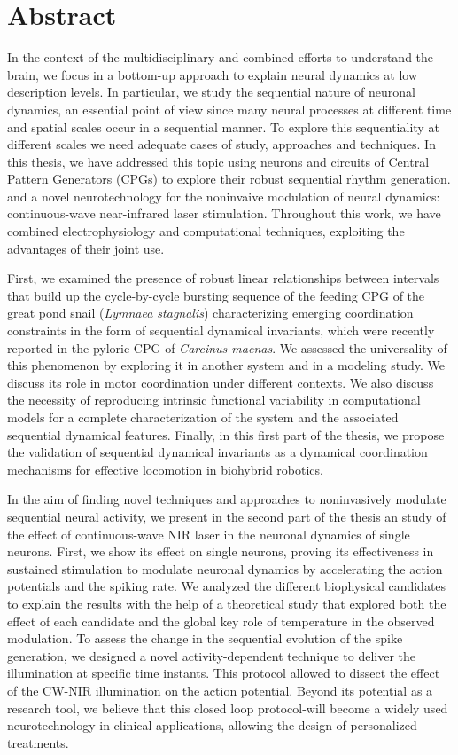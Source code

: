 \chapter*{Abstract}
In the context of the multidisciplinary and combined efforts to understand the brain, we focus in a bottom-up approach to explain neural dynamics at low description 
 levels. In particular, we study the sequential nature of neuronal dynamics, an essential point of view since many neural processes at different time and spatial scales occur in a sequential manner. To explore this sequentiality at different scales we need adequate cases of study, approaches and techniques. In this thesis, we have addressed this topic using neurons and circuits of Central Pattern Generators (CPGs) to explore their robust sequential rhythm generation. and a novel neurotechnology for the noninvaive modulation of neural dynamics: continuous-wave near-infrared laser stimulation. Throughout this work, we have combined electrophysiology and computational techniques, exploiting the advantages of their joint use. 

First, we examined the presence of robust linear relationships between intervals that build up the cycle-by-cycle bursting sequence of the feeding CPG of the great pond snail (\textit{Lymnaea stagnalis}) characterizing emerging coordination constraints in the form of sequential dynamical invariants, which were recently reported in the pyloric CPG of \textit{Carcinus maenas}. We assessed the universality of this phenomenon by exploring it in another system and in a modeling study. We discuss its role in motor coordination under different contexts. We also discuss the necessity of reproducing intrinsic functional variability in computational models for a complete characterization of the system and the associated sequential dynamical features. Finally, in this first part of the thesis, we propose  the validation of  sequential dynamical invariants as a dynamical coordination mechanisms for  effective locomotion in biohybrid robotics. 

In the aim of finding novel techniques and approaches to noninvasively modulate sequential neural activity, we present in the second part of the thesis an study of the effect of continuous-wave NIR laser in the neuronal dynamics of single neurons. First, we show its effect on single neurons, proving its effectiveness in sustained stimulation to modulate neuronal dynamics by accelerating the action potentials and the spiking rate. We analyzed the different biophysical candidates to  explain the  results with the help of a theoretical study  that explored both the effect of each candidate and the global key role of temperature in the observed modulation. To assess the change in the sequential evolution of the spike generation,  we designed a novel activity-dependent technique to deliver the illumination at specific time instants. This protocol allowed to dissect the effect of the CW-NIR illumination on the action potential. Beyond its potential as a research tool, we believe that this closed loop protocol-will become a widely used neurotechnology in clinical applications, allowing the design of personalized treatments. 

